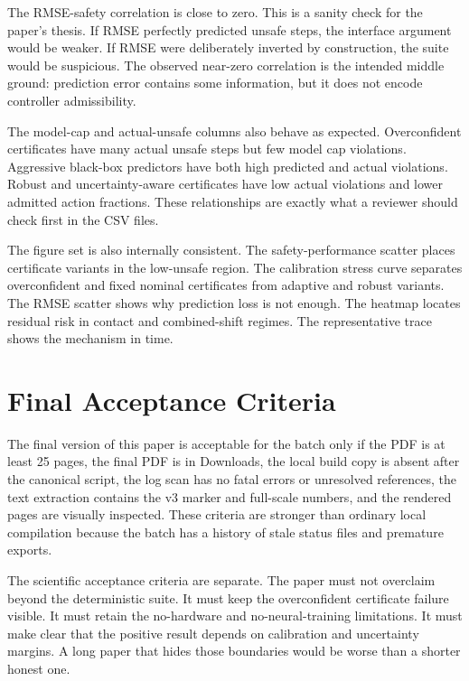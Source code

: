 \documentclass{article}
\begin{document}
The RMSE-safety correlation is close to zero. This is a sanity check for the paper's thesis. If RMSE perfectly predicted unsafe steps, the interface argument would be weaker. If RMSE were deliberately inverted by construction, the suite would be suspicious. The observed near-zero correlation is the intended middle ground: prediction error contains some information, but it does not encode controller admissibility.

The model-cap and actual-unsafe columns also behave as expected. Overconfident certificates have many actual unsafe steps but few model cap violations. Aggressive black-box predictors have both high predicted and actual violations. Robust and uncertainty-aware certificates have low actual violations and lower admitted action fractions. These relationships are exactly what a reviewer should check first in the CSV files.

The figure set is also internally consistent. The safety-performance scatter places certificate variants in the low-unsafe region. The calibration stress curve separates overconfident and fixed nominal certificates from adaptive and robust variants. The RMSE scatter shows why prediction loss is not enough. The heatmap locates residual risk in contact and combined-shift regimes. The representative trace shows the mechanism in time.

\section{Final Acceptance Criteria}

The final version of this paper is acceptable for the batch only if the PDF is at least 25 pages, the final PDF is in Downloads, the local build copy is absent after the canonical script, the log scan has no fatal errors or unresolved references, the text extraction contains the v3 marker and full-scale numbers, and the rendered pages are visually inspected. These criteria are stronger than ordinary local compilation because the batch has a history of stale status files and premature exports.

The scientific acceptance criteria are separate. The paper must not overclaim beyond the deterministic suite. It must keep the overconfident certificate failure visible. It must retain the no-hardware and no-neural-training limitations. It must make clear that the positive result depends on calibration and uncertainty margins. A long paper that hides those boundaries would be worse than a shorter honest one.
\end{document}
